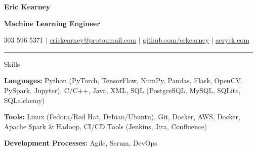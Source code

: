 \documentclass[12pt]{resumeclass}
\begin{document}
\vspace{12pt}
\centerline{\textbf{\LARGE{Eric Kearney}}}
\vspace{2pt}
\centerline{\textbf{\large{Machine Learning Engineer}}}
\vspace{2pt}
\centerline{303 596 5371 $|$ \href{mailto:erickearney@protonmail.com}{erickearney@protonmail.com} $|$ \href{https://github.com/erkearney}{github.com/erkearney} $|$ \href{https://aeryck.com}{aeryck.com}}
\vspace{2pt}
\rule{\textwidth}{0.4pt}
\vspace{0.5pt}

\resumesect
    {Skills}
    {\textbf{Languages:} \normalsize{Python (PyTorch, TensorFlow, NumPy, Pandas, Flask, OpenCV, PySpark, Jupyter), C/C++, Java, XML, SQL (PostgreSQL, MySQL, SQLite, SQLalchemy)}


    \vspace{3pt}
    \textbf{Tools:} \normalsize{Linux (Fedora/Red Hat, Debian/Ubuntu), Git, Docker,  AWS, Docker, Apache Spark \& Hadoop, CI/CD Tools (Jenkins, Jira, Confluence)}


    \vspace{3pt}
    \textbf{Development Processes:} \normalsize{Agile, Scrum, DevOps}}
\end{document}
